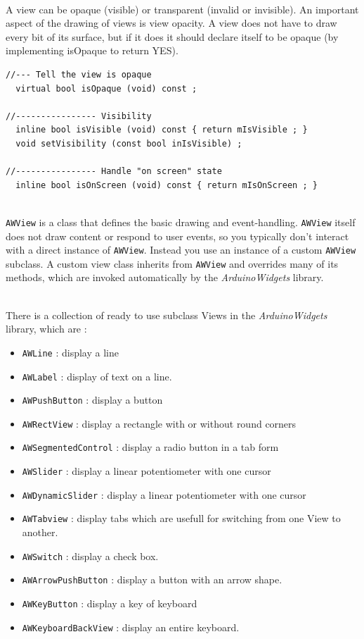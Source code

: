 \documentclass[a4paper,11pt]{extarticle}
\begin{document}
~\\ A view can be opaque (visible) or transparent (invalid or invisible). An important aspect of the drawing of views is view opacity. A view does not have to draw every bit of its surface, but if it does it should declare itself to be opaque (by implementing isOpaque to return YES).

\begin{lstlisting}[language=Arduinonl]
//--- Tell the view is opaque
  virtual bool isOpaque (void) const ;

//---------------- Visibility
  inline bool isVisible (void) const { return mIsVisible ; }
  void setVisibility (const bool inIsVisible) ;

//---------------- Handle "on screen" state
  inline bool isOnScreen (void) const { return mIsOnScreen ; }
\end{lstlisting}


~\\ \texttt{AWView} is a class that defines the basic drawing and event-handling. \texttt{AWView} itself does not draw content or respond to user events, so you typically don’t interact with a direct instance of \texttt{AWView}. Instead you use an instance of a custom \texttt{AWView} subclass. A custom view class inherits from \texttt{AWView} and overrides many of its methods, which are invoked automatically by the \emph{ArduinoWidgets} library.

~\\ There is a collection of ready to use subclass Views in the \emph{ArduinoWidgets} library, which are :
\begin{itemize}
\item \texttt{AWLine} : display a line
\item \texttt{AWLabel} : display of text on a line.
\item \texttt{AWPushButton} : display a button
\item \texttt{AWRectView} : display a rectangle with or without round corners
\item \texttt{AWSegmentedControl} : display a radio button in a tab form
\item \texttt{AWSlider} : display a linear potentiometer with one cursor
\item \texttt{AWDynamicSlider} : display a linear potentiometer with one cursor
\item \texttt{AWTabview} : display tabs which are usefull for switching from one View to another. 
\item \texttt{AWSwitch} : display a check box. 
\item \texttt{AWArrowPushButton} : display a button with an arrow shape. 
\item \texttt{AWKeyButton} : display a key of keyboard 
\item \texttt{AWKeyboardBackView} : display an entire keyboard. 
\end{itemize}
\end{document}
